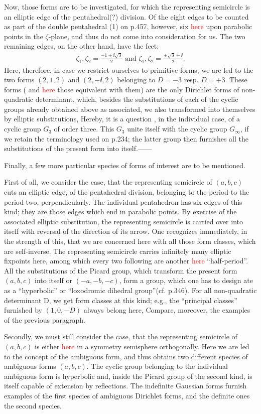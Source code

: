 Now, those forms are to be investigated, for which the representing semicircle is an elliptic edge of the pentahedral(?) division. Of the eight edges to be counted as part of the double pentahedral (1) on p.457, however, six \textcolor{red}{here} upon parabolic points in the $\zeta$-plane, and thus do not come into consideration for us. The two remaining edges, on the other hand, have the feet:
\begin{align}
    \zeta_1,\zeta_2=\frac{-1\pm\ii\sqrt{3}}{2} \text{ and } \zeta_1,\zeta_2=\frac{\pm\sqrt{3}+\ii}{2}.
\end{align}
Here, therefore, in case we restrict ourselves to primitive forms, we are led to the two forms $(2,1,2)$ and $(2,-\ii,2)$ belonging to $D=-3$ resp. $D=+3$. These forms ( and \textcolor{red}{here} those equivalent with them) are the only Dirichlet forms of non-quadratic determinant, which, besides the substitutions of each of the cyclic groups already obtained above as associated, we also transformed into themselves by elliptic substitutions, Hereby, it is a question , in the individual case, of a cyclic group $G_3$ of order three. This $G_3$ unite itself with the cyclic group $G_\infty$, if we retain the terminology used on p.234; the latter group then furnishes all the substitutions of the present form into itself.——

Finally, a few more particular species of forms of interest are to be mentioned.

First of all, we consider the case, that the representing semicircle of $(a,b,c)$ cuts an elliptic edge, of the pentahedral division, belonging to the period to the period two, perpendicularly. The individual pentahedron has six edges of this kind; they are those edges which end in parabolic points. By exercise of the associated elliptic substitution, the representing semicircle is carried over into itself with reversal of the direction of its arrow. One recognizes immediately, in the strength of this, that we are concerned here with all those form classes, which are self-inverse. The representing semicircle carries infinitely many elliptic fixpoints here, among which every two following are another \textcolor{red}{here} “half-period”. All the substitutions of the Picard group, which transform the present form $(a,b,c)$ into itself or $(-a,-b,-c)$, form a group, which one has to design ate as a “hyperbolic” or “loxodromic dihedral group”(cf. p.346). For all non-quadratic determinant D, we get form classes at this kind; e.g., the “principal classes” furnished by $(1,0,-D)$ always belong here, Compare, moreover, the examples of the previous paragraph.

Secondly, we must still consider the case, that the representing semicircle of $(a,b,c)$ is either \textcolor{red}{here} in a symmetry semisphere orthogonally. Here we are led to the concept of the ambiguous form, and thus obtains two different species of ambiguous forms $(a,b,c)$. The cyclic group belonging to the individual ambiguous form is hyperbolic and, inside the Picard group of the second kind, is itself capable of extension by reflections. The indefinite Gaussian forms furnish examples of the first species of ambiguous Dirichlet forms, and the definite ones the second species.
